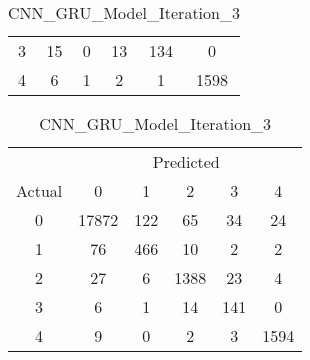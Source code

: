 \begin{table}[ht]
\begin{minipage}{0.32\textwidth}
\begin{tabular}{cccccc}
            3 & 15    & 0   & 13  & 134 & 0   \\
            4 & 6     & 1   & 2   & 1   & 1598\\
            \bottomrule
        \end{tabular}
    \end{minipage}
    \hfill
    \begin{minipage}{0.32\textwidth}
        \caption*{CNN\_GRU\_Model\_Iteration\_3}
        \begin{tabular}{cccccc}
            \toprule
            & \multicolumn{5}{c}{Predicted} \\
            \cmidrule(lr){2-6}
            Actual & 0 & 1 & 2 & 3 & 4 \\
            \midrule
            0 & 17872 & 122 & 65  & 34  & 24  \\
            1 & 76    & 466 & 10  & 2   & 2   \\
            2 & 27    & 6   & 1388& 23  & 4   \\
            3 & 6     & 1   & 14  & 141 & 0   \\
            4 & 9     & 0   & 2   & 3   & 1594\\
            \bottomrule
        \end{tabular}
    \end{minipage}
\end{table}

\vspace{1em}

